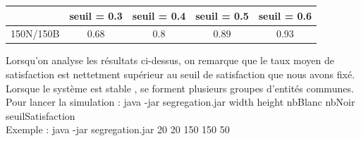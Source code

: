 \documentclass[a4paper,12pt]{report}
\begin{document}
\begin{center}
\begin{tabular}{|c|c|c|c|c|}
\hline
      &   seuil = 0.3 & seuil = 0.4 & seuil = 0.5 & seuil = 0.6 \\
\hline
150N/150B & 0.68 & 0.8 & 0.89 & 0.93 \\
\hline 
\end{tabular}
\end{center}
Lorsqu'on analyse les résultats ci-dessus, on remarque que le taux moyen de satisfaction est nettetment supérieur au seuil de satisfaction que nous avons fixé. Lorsque le système est stable , se forment plusieurs groupes d'entités communes.\\

\noindent Pour lancer la simulation : java -jar segregation.jar width height nbBlanc nbNoir seuilSatisfaction\\
Exemple :  java -jar segregation.jar 20 20 150 150 50
\newpage
\end{document}
